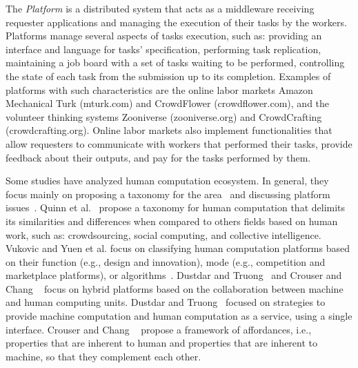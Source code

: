 \documentclass[11pt]{bmc_article_s50}
\begin{document}
The \textit{Platform} is a distributed system that acts as a middleware receiving requester applications and managing the execution of their tasks by the workers. Platforms manage several aspects of tasks execution, such as: providing an interface and language for tasks' specification, performing task replication, maintaining a job board with a set of tasks waiting to be performed, controlling the state of each task from the submission up to its completion. Examples of platforms with such characteristics are the online labor markets Amazon Mechanical Turk (mturk.com) and CrowdFlower (crowdflower.com), and the volunteer thinking systems Zooniverse (zooniverse.org) and CrowdCrafting (crowdcrafting.org). Online labor markets also implement functionalities that allow requesters to communicate with workers that performed their tasks, provide feedback about their outputs, and pay for the tasks performed by them.

Some studies have analyzed human computation ecosystem. In general, they focus mainly on proposing a taxonomy for the area~\cite{Quinn2009,Quinn2011,Yuen:2009,Vukovic:2009} and discussing platform issues~\cite{Dustdar2012,Crouser:2012}. Quinn et al.~\cite{Quinn2009,Quinn2011} propose a taxonomy for human computation that delimits its similarities and differences when compared to others fields based on human work, such as: crowdsourcing, social computing, and collective intelligence. Vukovic and Yuen et al. focus on classifying human computation platforms based on their function (e.g., design and innovation), mode (e.g., competition and marketplace platforms), or algorithms~\cite{Vukovic:2009,Yuen:2009}. Dustdar and Truong~\cite{Dustdar2012} and Crouser and Chang ~\cite{Crouser:2012} focus on hybrid platforms based on the collaboration between machine and human computing units. Dustdar and Truong~\cite{Dustdar2012} focused on strategies to provide machine computation and human computation as a service, using a single interface. Crouser and Chang ~\cite{Crouser:2012} propose a framework of affordances, i.e., properties that are inherent to human and properties that are inherent to machine, so that they complement each other.
\end{document}
